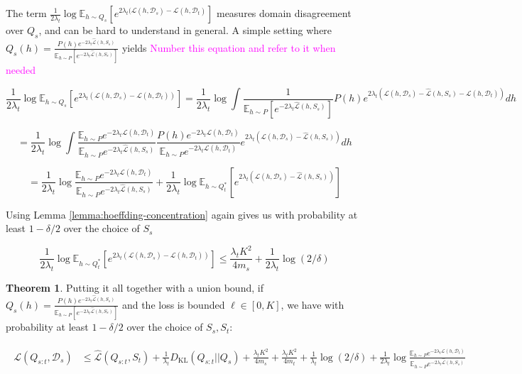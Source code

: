 \documentclass[letterpaper]{article}
\theoremstyle{definition}
\newtheorem{theorem}{Theorem}
\newcommand{\RM}[1]{{\textcolor{magenta}{#1}}}
\begin{document}
The term $\frac{1}{2\lambda_t}\log \mathbb{E}_{h\sim Q_{s}}\left [e^{2\lambda_t(\mathcal{L}(h,\mathcal{D}_s)-\mathcal{L}(h,\mathcal{D}_t)}\right ]$ measures domain disagreement over $Q_s$, and can be hard to understand in general. A simple setting where $Q_s(h)=\frac{P(h)e^{-2\lambda_t\hat{\mathcal{L}}(h,S_s)}}{\mathbb{E}_{h\sim P}\left [e^{-2\lambda_t\hat{\mathcal{L}}(h,S_s)} \right ]}$ yields \RM{Number this equation and refer to it when needed}

$$\frac{1}{2\lambda_t}\log \mathbb{E}_{h\sim Q_{s}}\left [e^{2\lambda_t(\mathcal{L}(h,\mathcal{D}_s)-\mathcal{L}(h,\mathcal{D}_t))}\right ]=\frac{1}{2\lambda_t}\log \int \frac{1}{\mathbb{E}_{h\sim P}\left [e^{-2\lambda_t\hat{\mathcal{L}}(h,S_s)} \right ]}P(h)e^{2\lambda_t(\mathcal{L}(h,\mathcal{D}_s)-\hat{\mathcal{L}}(h,S_s)-\mathcal{L}(h,\mathcal{D}_t))}dh$$

$$=\frac{1}{2\lambda_t}\log \int \frac{\mathbb{E}_{h\sim P} e^{-2\lambda_t\mathcal{L}(h,\mathcal{D}_t)}}{\mathbb{E}_{h\sim P} e^{-2\lambda_t\hat{\mathcal{L}}(h,S_s)}  }\frac{P(h)e^{-2\lambda_t\mathcal{L}(h,\mathcal{D}_t)}}{\mathbb{E}_{h\sim P} e^{-2\lambda_t\mathcal{L}(h,\mathcal{D}_t)}}e^{2\lambda_t(\mathcal{L}(h,\mathcal{D}_s)-\hat{\mathcal{L}}(h,S_s))}dh$$

$$=\frac{1}{2\lambda_t}\log\frac{\mathbb{E}_{h\sim P} e^{-2\lambda_t\mathcal{L}(h,\mathcal{D}_t)}}{\mathbb{E}_{h\sim P} e^{-2\lambda_t\hat{\mathcal{L}}(h,S_s)}  }+\frac{1}{2\lambda_t}\log\mathbb{E}_{h\sim Q^{*}_t}\left [e^{2\lambda_t(\mathcal{L}(h,\mathcal{D}_s)-\hat{\mathcal{L}}(h,S_s))}\right ]$$

Using Lemma \ref{lemma:hoeffding-concentration} again gives us with probability at least $1-\delta/2$ over the choice of $S_s$

$$\frac{1}{2\lambda_t}\log \mathbb{E}_{h\sim Q^{*}_t}\left [e^{2\lambda_t(\mathcal{L}(h,\mathcal{D}_s)-\mathcal{L}(h,\mathcal{D}_t))}\right ] \leq \frac{\lambda_t K^2}{4m_s}+\frac{1}{2\lambda_t}\log(2/\delta)$$

\begin{theorem}
Putting it all together with a union bound, if $Q_s(h)=\frac{P(h)e^{-2\lambda_t\hat{\mathcal{L}}(h,S_s)}}{\mathbb{E}_{h\sim P}\left [e^{-2\lambda_t\hat{\mathcal{L}}(h,S_s)} \right ]}$ and the loss is bounded $\ell\in[0,K]$, we have with probability at least $1-\delta/2$ over the choice of $S_s,S_t$:

\begin{align}
\begin{split}
\mathcal{L}(Q_{s:t}, \mathcal{D}_s) &\leq \hat{\mathcal{L}}(Q_{s:t}, S_t) + \frac{1}{\lambda_t} D_{\mathrm{KL}}(Q_{s:t}||Q_{s})
+\frac{\lambda_t K^2}{4m_s}+\frac{\lambda_t K^2}{4m_t}+\frac{1}{\lambda_t}\log(2/\delta)+\frac{1}{2\lambda_t}\log\frac{\mathbb{E}_{h\sim P} e^{-2\lambda_t\mathcal{L}(h,\mathcal{D}_t)}}{\mathbb{E}_{h\sim P} e^{-2\lambda_t\hat{\mathcal{L}}(h,S_s)}  }
\end{split}
\end{align}
\end{theorem}
\end{document}

